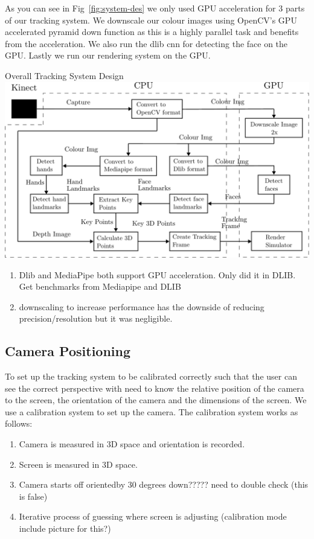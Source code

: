As you can see in Fig~\ref{fig:system-des} we only used GPU acceleration for 3 parts of our tracking system. We downscale our colour images using OpenCV's GPU accelerated pyramid down function as this is a highly parallel task and benefits from the acceleration. We also run the dlib cnn for detecting the face on the GPU. Lastly we run our rendering system on the GPU.
\begin{figureBox}[label={fig:system-des}, width=0.8\linewidth]{Overall Tracking System Design}
    \includegraphics[width = 0.8\linewidth]{./implementation/figures/tracking-system.pdf}
\end{figureBox}

\begin{enumerate}[itemsep=-0.25em]
	\item Dlib and MediaPipe both support GPU acceleration. Only did it in DLIB. Get benchmarks from Mediapipe and DLIB
	\item downscaling to increase performance has the downside of reducing precision/resolution but it was negligible.
\end{enumerate}


\subsection{Camera Positioning}

To set up the tracking system to be calibrated correctly such that the user can see the correct perspective with need to know the relative position of the camera to the screen, the orientation of the camera and the dimensions of the screen. We use a calibration system to set up the camera. The calibration system works as follows:


\begin{enumerate}[itemsep=-0.25em]
	\item Camera is measured in 3D space and orientation is recorded.
	\item Screen is measured in 3D space. 
	\item Camera starts off orientedby 30 degrees down????? need to double check (this is false)
	\item Iterative process of guessing where screen is adjusting (calibration mode include picture for this?)
\end{enumerate}
